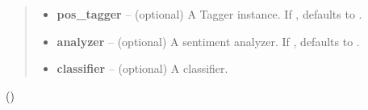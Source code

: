 \documentclass[letterpaper,10pt,english]{sphinxmanual}
\begin{document}
\begin{fulllineitems}
\begin{quote}
\begin{description}
\begin{itemize}
\item {} 
\textbf{pos\_tagger} -- (optional) A Tagger instance. If , defaults to
{\hyperref[api_reference:textblob_de.taggers.PatternTagger]{}}.

\item {} 
\textbf{analyzer} -- (optional) A sentiment analyzer. If , defaults to
{\hyperref[api_reference:textblob_de.sentiments.PatternAnalyzer]{}}.

\item {} 
\textbf{classifier} -- (optional) A classifier.

\end{itemize}

\end{description}\end{quote}

()

\end{fulllineitems}

\end{document}
